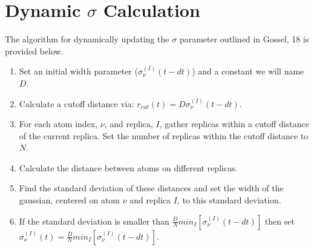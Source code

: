 \chapter{Dynamic $\sigma$ Calculation}
\label{ap:DynamicSigma}
The algorithm for dynamically updating the $\sigma$ parameter outlined in Gossel, 18 \cite{gossel_coupled-trajectory_2018} is provided below.
\begin{enumerate}
  \item Set an initial width parameter ($\sigma_{\nu}^{(I)}(t - dt)$) and a   constant we will name $D$.
  \item Calculate a cutoff distance via: $r_{cut}(t) = D                      \sigma_{\nu}^{(I)}(t - dt)$.
  \item For each atom index, $\nu$, and replica, $I$, gather replicas within  a cutoff distance of the current replica. Set the number of replicas within   the cutoff distance to $N$.
  \item Calculate the distance between atoms on different replicas.
  \item Find the standard deviation of these distances and set the width of   the gaussian, centered on atom $\nu$ and replica $I$, to this standard        deviation.
  \item If the standard deviation is smaller than $\frac{D}{N} min_{I} \left[ \sigma_{\nu}^{(I)} (t - dt) \right]$ then set $\sigma_{\nu}^{(I)}(t) =        \frac{D}{N} min_{I} \left[ \sigma_{\nu}^{(I)} (t - dt) \right]$.
\end{enumerate}

